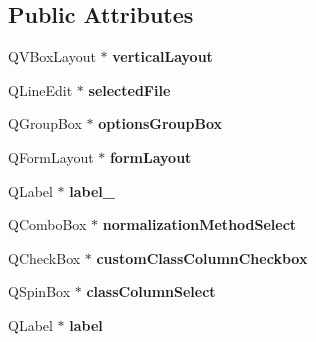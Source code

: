 \subsection*{Public Attributes}
\begin{DoxyCompactItemize}
\item 
Q\+V\+Box\+Layout $\ast$ {\bfseries vertical\+Layout}\hypertarget{class_ui___load_data_dialog_a002c7621aef014c371701705db4b35d3}{}\label{class_ui___load_data_dialog_a002c7621aef014c371701705db4b35d3}

\item 
Q\+Line\+Edit $\ast$ {\bfseries selected\+File}\hypertarget{class_ui___load_data_dialog_ab1bc2c1ad7aa6615828c1812ad9bd190}{}\label{class_ui___load_data_dialog_ab1bc2c1ad7aa6615828c1812ad9bd190}

\item 
Q\+Group\+Box $\ast$ {\bfseries options\+Group\+Box}\hypertarget{class_ui___load_data_dialog_ad60f3985511153779fb0200ed7db5807}{}\label{class_ui___load_data_dialog_ad60f3985511153779fb0200ed7db5807}

\item 
Q\+Form\+Layout $\ast$ {\bfseries form\+Layout}\hypertarget{class_ui___load_data_dialog_a46eae3971f22aefe59e1695e305798a9}{}\label{class_ui___load_data_dialog_a46eae3971f22aefe59e1695e305798a9}

\item 
Q\+Label $\ast$ {\bfseries label\+\_}\hypertarget{class_ui___load_data_dialog_aa0c326df664e0b73dab39092f5b46764}{}\label{class_ui___load_data_dialog_aa0c326df664e0b73dab39092f5b46764}

\item 
Q\+Combo\+Box $\ast$ {\bfseries normalization\+Method\+Select}\hypertarget{class_ui___load_data_dialog_a3b41717667b756a6a0ae78754f98a173}{}\label{class_ui___load_data_dialog_a3b41717667b756a6a0ae78754f98a173}

\item 
Q\+Check\+Box $\ast$ {\bfseries custom\+Class\+Column\+Checkbox}\hypertarget{class_ui___load_data_dialog_aebbf19e0034880f19ba7cb595d081b6a}{}\label{class_ui___load_data_dialog_aebbf19e0034880f19ba7cb595d081b6a}

\item 
Q\+Spin\+Box $\ast$ {\bfseries class\+Column\+Select}\hypertarget{class_ui___load_data_dialog_a4da2ea8a9a2fe384d95768bc8b33c6f6}{}\label{class_ui___load_data_dialog_a4da2ea8a9a2fe384d95768bc8b33c6f6}

\item 
Q\+Label $\ast$ {\bfseries label}\hypertarget{class_ui___load_data_dialog_aacc2412992d9d26b187bb2369df38516}{}\label{class_ui___load_data_dialog_aacc2412992d9d26b187bb2369df38516}


\end{DoxyCompactItemize}
